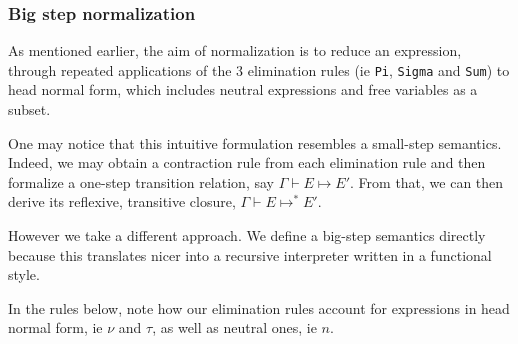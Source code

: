 \documentclass{article}
\begin{document}
\subsubsection{Big step normalization}

As mentioned earlier, the aim of normalization is to reduce an
expression, through repeated applications of the 3 elimination rules
(ie \verb|Pi|, \verb|Sigma| and \verb|Sum|) to head normal form, which includes
neutral expressions and free variables as a subset.

One may notice that this intuitive formulation resembles a small-step semantics.
Indeed, we may obtain a contraction rule from each elimination rule and then
formalize a one-step transition relation, say $\Gamma \vdash E \longmapsto E'$.
From that, we can then derive its reflexive, transitive closure,
$\Gamma \vdash E \longmapsto^* E'$.

However we take a different approach. We define a big-step semantics
directly because this translates nicer into a recursive interpreter written in a
functional style.

In the rules below, note how our elimination rules account for expressions
in head normal form, ie $\nu$ and $\tau$, as well as neutral ones, ie $n$.


\end{document}
